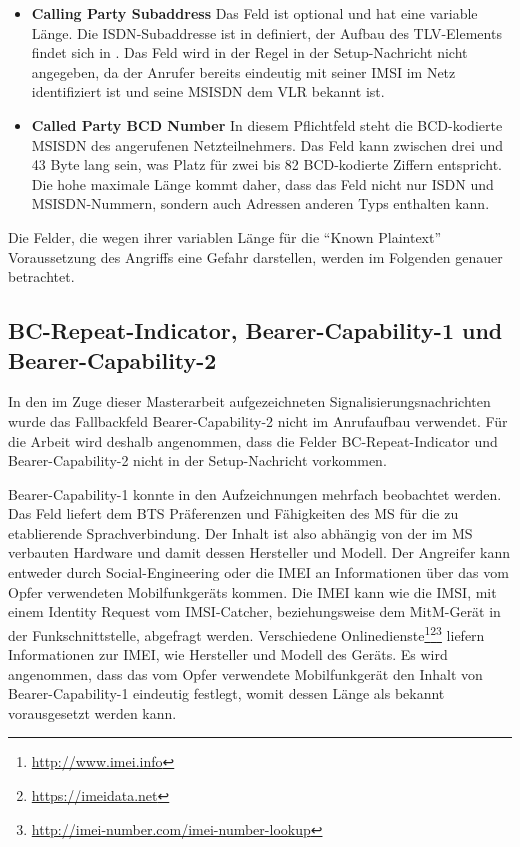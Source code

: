 \begin{itemize}
\item \textbf{Calling Party Subaddress} Das Feld ist optional und hat eine variable Länge. Die \ac{ISDN}-Subaddresse ist in  definiert, der Aufbau des \ac{TLV}-Elements findet sich in . Das Feld wird in der Regel in der Setup-Nachricht nicht angegeben, da der Anrufer bereits eindeutig mit seiner \ac{IMSI} im Netz identifiziert ist und seine \ac{MSISDN} dem \ac{VLR} bekannt ist.
\item \textbf{Called Party BCD Number} In diesem Pflichtfeld steht die \ac{BCD}-kodierte \ac{MSISDN} des angerufenen Netzteilnehmers. Das Feld kann zwischen drei und 43 Byte lang sein, was Platz für zwei bis 82 \ac{BCD}-kodierte Ziffern entspricht. Die hohe maximale Länge kommt daher, dass das Feld nicht nur \ac{ISDN} und \ac{MSISDN}-Nummern, sondern auch Adressen anderen Typs enthalten kann.
\end{itemize}

Die Felder, die wegen ihrer variablen Länge für die "`Known Plaintext"' Voraussetzung des Angriffs eine Gefahr darstellen, werden im Folgenden genauer betrachtet.

\subsection*{BC-Repeat-Indicator, Bearer-Capability-1 und Bearer-Capability-2}

In den im Zuge dieser Masterarbeit aufgezeichneten Signalisierungsnachrichten wurde das Fallbackfeld Bearer-Capability-2 nicht im Anrufaufbau verwendet. Für die Arbeit wird deshalb angenommen, dass die Felder BC-Repeat-Indicator und Bearer-Capability-2 nicht in der Setup-Nachricht vorkommen.

Bearer-Capability-1 konnte in den Aufzeichnungen mehrfach beobachtet werden. Das Feld liefert dem \ac{BTS} Präferenzen und Fähigkeiten des \ac{MS} für die zu etablierende Sprachverbindung. Der Inhalt ist also abhängig von der im \ac{MS} verbauten Hardware und damit dessen Hersteller und Modell. Der Angreifer kann entweder durch Social-Engineering oder die \ac{IMEI} an Informationen über das vom Opfer verwendeten Mobilfunkgeräts kommen. Die \ac{IMEI} kann wie die \ac{IMSI}, mit einem Identity Request vom \ac{IMSI}-Catcher, beziehungsweise dem \ac{MitM}-Gerät in der Funkschnittstelle, abgefragt werden. Verschiedene Onlinedienste\footnote{\url{http://www.imei.info}}\footnote{\url{https://imeidata.net}}\footnote{\url{http://imei-number.com/imei-number-lookup}} liefern Informationen zur \ac{IMEI}, wie Hersteller und Modell des Geräts. Es wird angenommen, dass das vom Opfer verwendete Mobilfunkgerät den Inhalt von Bearer-Capability-1 eindeutig festlegt, womit dessen Länge als bekannt vorausgesetzt werden kann.


